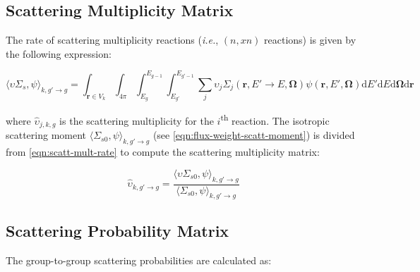 \subsection{Scattering Multiplicity Matrix}
\label{subsubsec:tally-types-mult-mat}

The rate of scattering multiplicity reactions (\textit{i.e.}, $(n,xn)$ reactions) is given by the following expression:

\begin{equation}
\label{eqn:scatt-mult-rate}
\langle \upsilon \Sigma_{s}, \psi \rangle_{k,g'\rightarrow g} = \int_{\mathbf{r} \in V_{k}} \int_{4\pi} \int_{E_g}^{E_{g-1}} \int_{E_{g'}}^{E_{g'-1}} \sum_j \upsilon_j \Sigma_j (\mathbf{r}, E' \rightarrow E, \mathbf{\Omega}) \psi(\mathbf{r}, E', \mathbf{\Omega}) \mathrm{d}E'\mathrm{d}E\mathrm{d}\mathbf{\Omega}\mathrm{d}\mathbf{r}
\end{equation}

\noindent where $\hat{\upsilon}_{j,k,g}$ is the scattering multiplicity for the $i$\textsuperscript{th} reaction. The isotropic scattering moment $\langle \Sigma_{s0}, \psi \rangle_{k,g'\rightarrow g}$ (see \autoref{eqn:flux-weight-scatt-moment}) is divided from \cref{eqn:scatt-mult-rate} to compute the scattering multiplicity matrix:

\begin{equation}
\label{eqn:scatt-mult-mat}
\hat{\upsilon}_{k,g'\rightarrow g} = \frac{{\langle \upsilon \Sigma_{s0}, \psi \rangle}_{k,g'\rightarrow g}}{{\langle \Sigma_{s0}, \psi \rangle}_{k,g'\rightarrow g}}
\end{equation}

\subsection{Scattering Probability Matrix}
\label{subsubsec:tally-types-scatt-prob-mat}

The group-to-group scattering probabilities are calculated as:

%


